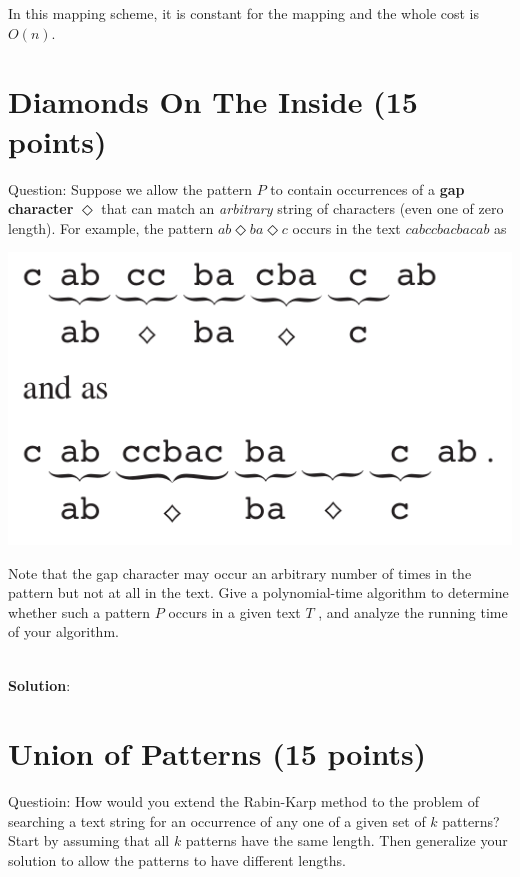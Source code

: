 \documentclass{article}
\begin{document}
In this mapping scheme, it is constant for the mapping and the whole cost is $O(n)$.

\section{Diamonds On The Inside (15 points)}
Question: Suppose we allow the pattern $P$ to contain occurrences of a \textbf{gap character} $\Diamond$ that can match an \emph{arbitrary} string of characters (even one of zero length). For example, the pattern $ab\Diamond{ba}\Diamond{c}$ occurs in the text $cabccbacbacab$ as

\begin{center} %
\includegraphics[scale=0.3]{p2.png} %
\end{center}

\noindent Note that the gap character may occur an arbitrary number of times in the pattern but not at all in the text. Give a polynomial-time algorithm to determine whether such a pattern $P$ occurs in a given text $T$ , and analyze the running time of your algorithm.

~\\
\textbf{Solution}:\newline
\indent 


\section{Union of Patterns (15 points)}
Questioin: How would you extend the Rabin-Karp method to the problem of searching a text string for an occurrence of any one of a given set of $k$ patterns? Start by assuming that all $k$ patterns have the same length. Then generalize your solution to allow the patterns to have different lengths.
\end{document}
